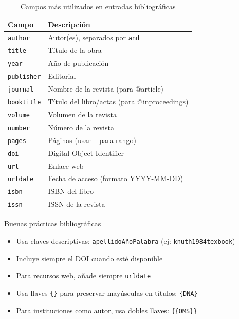 \begin{table}[htbp]
  \centering
  \caption{Campos más utilizados en entradas bibliográficas}
  \label{tab:campos-bib}
  \EPScabeceraTabla
  \begin{tabular}{lp{8cm}}
    \toprule
    \textbf{Campo} & \textbf{Descripción} \\
    \midrule
    \texttt{author}    & Autor(es), separados por \texttt{and} \\
    \texttt{title}     & Título de la obra \\
    \texttt{year}      & Año de publicación \\
    \texttt{publisher} & Editorial \\
    \texttt{journal}   & Nombre de la revista (para @article) \\
    \texttt{booktitle} & Título del libro/actas (para @inproceedings) \\
    \texttt{volume}    & Volumen de la revista \\
    \texttt{number}    & Número de la revista \\
    \texttt{pages}     & Páginas (usar \texttt{--} para rango) \\
    \texttt{doi}       & Digital Object Identifier \\
    \texttt{url}       & Enlace web \\
    \texttt{urldate}   & Fecha de acceso (formato YYYY-MM-DD) \\
    \texttt{isbn}      & ISBN del libro \\
    \texttt{issn}      & ISSN de la revista \\
    \bottomrule
  \end{tabular}
\end{table}

\begin{tipbox}{Buenas prácticas bibliográficas}
  \begin{itemize}[noitemsep]
    \item Usa claves descriptivas: \texttt{apellidoAñoPalabra} (ej: \texttt{knuth1984texbook})
    \item Incluye siempre el DOI cuando esté disponible
    \item Para recursos web, añade siempre \texttt{urldate}
    \item Usa llaves \texttt{\{\}} para preservar mayúsculas en títulos: \texttt{\{DNA\}}
    \item Para instituciones como autor, usa dobles llaves: \texttt{\{\{OMS\}\}}
  \end{itemize}
\end{tipbox}

